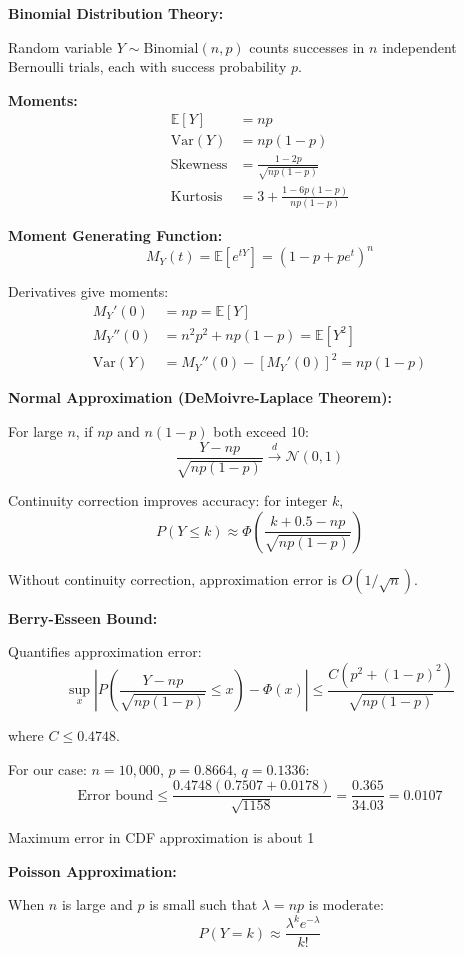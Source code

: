 \documentclass[12pt]{article}
\begin{document}
\begin{explanation}

\textbf{Binomial Distribution Theory:}

Random variable $Y \sim \text{Binomial}(n, p)$ counts successes in $n$ independent Bernoulli trials, each with success probability $p$.

\textbf{Moments:}
\begin{align*}
\mathbb{E}[Y] &= np \\
\text{Var}(Y) &= np(1-p) \\
\text{Skewness} &= \frac{1-2p}{\sqrt{np(1-p)}} \\
\text{Kurtosis} &= 3 + \frac{1-6p(1-p)}{np(1-p)}
\end{align*}

\textbf{Moment Generating Function:}
\[
M_Y(t) = \mathbb{E}[e^{tY}] = (1-p+pe^t)^n
\]

Derivatives give moments:
\begin{align*}
M_Y'(0) &= np = \mathbb{E}[Y] \\
M_Y''(0) &= n^2p^2 + np(1-p) = \mathbb{E}[Y^2] \\
\text{Var}(Y) &= M_Y''(0) - [M_Y'(0)]^2 = np(1-p)
\end{align*}

\textbf{Normal Approximation (DeMoivre-Laplace Theorem):}

For large $n$, if $np$ and $n(1-p)$ both exceed 10:
\[
\frac{Y - np}{\sqrt{np(1-p)}} \xrightarrow{d} \mathcal{N}(0,1)
\]

Continuity correction improves accuracy: for integer $k$,
\[
P(Y \leq k) \approx \Phi\left(\frac{k + 0.5 - np}{\sqrt{np(1-p)}}\right)
\]

Without continuity correction, approximation error is $O(1/\sqrt{n})$.

\textbf{Berry-Esseen Bound:}

Quantifies approximation error:
\[
\sup_x \left|P\left(\frac{Y - np}{\sqrt{np(1-p)}} \leq x\right) - \Phi(x)\right| \leq \frac{C(p^2 + (1-p)^2)}{\sqrt{np(1-p)}}
\]

where $C \leq 0.4748$.

For our case: $n = 10,000$, $p = 0.8664$, $q = 0.1336$:
\[
\text{Error bound} \leq \frac{0.4748(0.7507 + 0.0178)}{\sqrt{1158}} = \frac{0.365}{34.03} = 0.0107
\]

Maximum error in CDF approximation is about 1%

\textbf{Poisson Approximation:}

When $n$ is large and $p$ is small such that $\lambda = np$ is moderate:
\[
P(Y = k) \approx \frac{\lambda^k e^{-\lambda}}{k!}
\]


\end{explanation}
\end{document}
